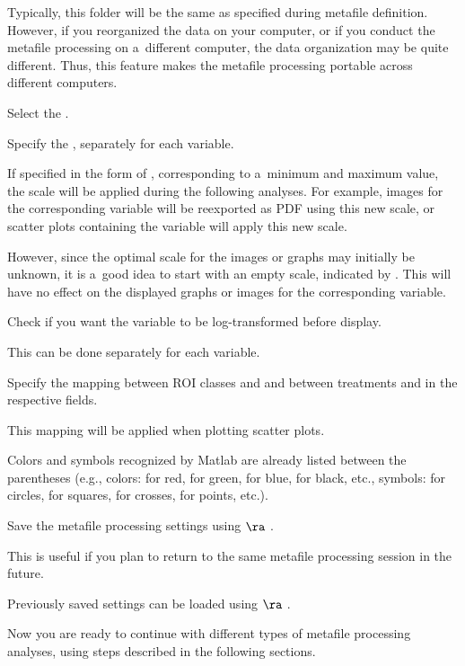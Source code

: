 \nb
\bul Typically, this folder will be the same as specified during metafile definition. However, if you reorganized the data on your computer, or if you conduct the metafile processing on a~different computer, the data organization may be quite different. Thus, this feature makes the metafile processing portable across different computers.

\s Select the .

\s Specify  the , separately for each variable.

\nb
\bul If specified in the form of , corresponding to a~minimum and maximum value, the scale will be applied during the following analyses. For example, images for the corresponding variable will be reexported as PDF using this new scale, or scatter plots containing the variable will apply this new scale.

\bul However, since the optimal scale for the images or graphs may initially be unknown, it is a~good idea to start with an empty scale, indicated by \ttt{[]}. This will have no effect on the displayed graphs or images for the corresponding variable.

\s Check  if you want the variable to be log-transformed before display.

\nb
\bul This can be done separately for each variable.

\s Specify the mapping between ROI classes and  and between treatments and  in the respective fields. 

\nb
\bul This mapping will be applied when plotting scatter plots.

\bul Colors and symbols recognized by Matlab are already listed between the parentheses (e.g., colors:  for red,  for green,  for blue,  for black, etc., symbols:  for circles,  for squares,  for crosses,  for points, etc.).

\s Save the metafile processing settings using  $\ra$ .

\nb
\bul This is useful if you plan to return to the same metafile processing session in the future.

\bul Previously saved settings can be loaded using  $\ra$ .

\bul Now you are ready to continue with different types of metafile processing analyses, using steps described in the following sections.

